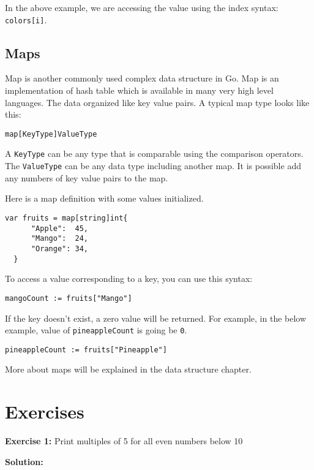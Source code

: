 In the above example, we are accessing the value using the index
syntax: \texttt{colors[i]}.

\subsection{Maps}

Map is another commonly used complex data structure in Go.
Map is an implementation of hash table which is available in many very
high level languages.  The data organized like key value pairs.  A
typical map type looks like this:

\begin{lstlisting}[numbers=none]
map[KeyType]ValueType
\end{lstlisting}

A \texttt{KeyType} can be any type that is comparable using the
comparison operators.  The \texttt{ValueType} can be any data type
including another map.  It is possible add any numbers of key value
pairs to the map.

Here is a map definition with some values initialized.

\begin{lstlisting}[numbers=none]
var fruits = map[string]int{
      "Apple":  45,
      "Mango":  24,
      "Orange": 34,
  }
\end{lstlisting}

To access a value corresponding to a key, you can use this syntax:

\begin{lstlisting}[numbers=none]
mangoCount := fruits["Mango"]
\end{lstlisting}

If the key doesn't exist, a zero value will be returned. For example, in the
below example, value of \texttt{pineappleCount} is going be \texttt{0}.

\begin{lstlisting}[numbers=none]
pineappleCount := fruits["Pineapple"]
\end{lstlisting}

More about maps will be explained in the data structure chapter.

\section{Exercises}

\textbf{Exercise 1:} Print multiples of 5 for all even numbers below 10

\textbf{Solution:}

